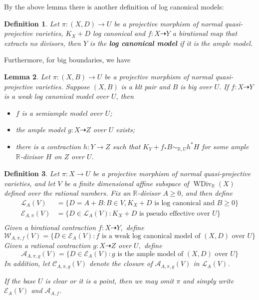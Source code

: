 \documentclass[11pt]{amsart}
\newtheorem{defn}{Definition}[section]
\newtheorem{lem}[defn]{Lemma}
\begin{document}
By the above lemma there is another definition of log canonical models:

\begin{defn}
  Let $ \pi:(X,D)\to U $ be a projective morphism of normal quasi-projective varieties, $ K_X+D $ log canonical and $ f:X\dashrightarrow Y $  a birational map that extracts no divisors, then $ Y $ is the \textbf{log canonical model} if it is the ample model. 
\end{defn}

Furthermore, for big boundaries, we have
\begin{lem}\cite[Lemma 3.9.3]{BCHM10} Let $ \pi:(X,B)\to U $ be a projective morphism of normal quasi-projective varieties. Suppose $(X,B)$ is a klt pair and  $B$ is big over $U$. If $f:X\dashrightarrow Y$ is a weak log canonical model over $U$, then
  \begin{itemize}
    \item $f$ is a semiample model over $U$;
    \item  the ample model $g:X \dashrightarrow Z$ over $U$ exists;
    \item  there is a contraction $h:Y\to Z$ such that $K_{Y}+f_*B\sim_{\mathbb{R},U} h^*H$ for some ample $\mathbb{R}$-divisor $H$ on $Z$ over $U$.   
  \end{itemize}
\end{lem}

\begin{defn}\label{polytopeofdivisor}
  \cite[Definition 1.1.4]{BCHM10} Let $ \pi:X\to U $ be a projective morphism of normal quasi-projective varieties, and  let $ V $ be a finite dimensional affine subspace of $ \operatorname{WDiv}_{\mathbb{R}}(X) $ defined over the rational numbers. Fix an $ \mathbb{R} $-divisor $ A\geqslant 0 $, and then define
  \[
    \begin{aligned}
      \mathcal{L}_A(V)&=\{D=A+B:B \in V,  K_X+D \text{ is log canonical and  } B\geqslant0 \}\\
      \mathcal{E}_{A,\pi}(V)&=\{D\in \mathcal{L}_A(V): K_X+D \text{ is pseudo effective over } U\}\\ 
    \end{aligned}
  \]
  Given a birational contraction $ f:X \dashrightarrow Y,$ define
  \[ \mathcal{W}_{A,\pi,f}(V)=\{D\in \mathcal{E}_{A}(V): f \text{ is a weak log canonical model of  } (X,D) \text{ over }U\} \]
  Given a rational contraction $g:X\dashrightarrow Z  $ over $ U, $ define
  \[ \mathcal{A}_{A,\pi,g}(V)=\{D\in \mathcal{E}_{A}(V): g \text{ is the ample model of  } (X,D) \text{ over }U\} \]
  In addition, let $ \mathcal{C}_{A,\pi,g}(V) $ denote the closure of $ \mathcal{A}_{A,\pi,g}(V) $ in $\mathcal{L}_{A}(V)$.

  If the base $U$ is clear or it is a point, then we may omit $\pi$ and simply write $\mathcal{E}_{A}(V)$ and $\mathcal{A}_{A,f}$.
\end{defn}
\end{document}
